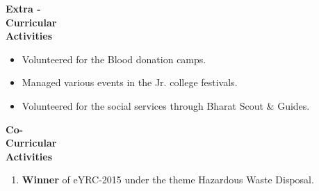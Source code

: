 \documentclass{article}
\begin{document}
	     	 	
	     \begin{flushleft} 
	     	\vspace{0.4in}
	     	\textbf{Extra - \\Curricular \\Activities }
	     	\begin{itemize}
	     		\vspace{-0.65in}
	     		\addtolength{\itemindent}{1.359in}
	     		\item  Volunteered for the Blood donation camps.
	     		\item  Managed various events in the Jr. college festivals.
	     		\item  Volunteered for the social services through Bharat Scout \& Guides.  
	     		
	     	\end{itemize}
	     \end{flushleft}
	     
	   \begin{flushleft} 
	      	\vspace{0.4in}
	      	\textbf{Co- \\Curricular \\Activities }
	      	\begin{enumerate}
	      		\vspace{-0.65in}
	      		\addtolength{\itemindent}{1.359in}
	      		\item  \textbf{Winner} of eYRC-2015 under the theme Hazardous Waste Disposal. 
	      	\end{enumerate}
	      \end{flushleft}
	
\end{document}
